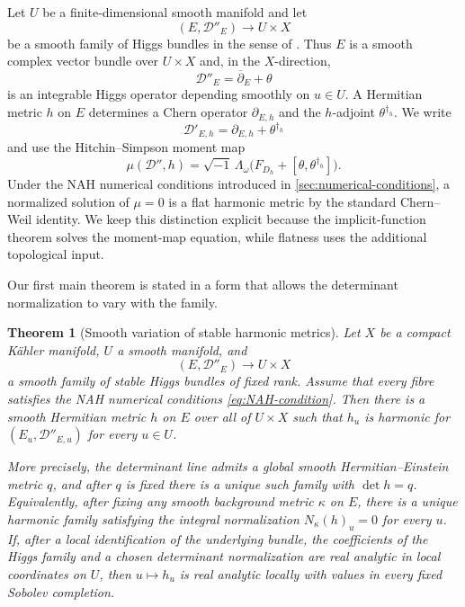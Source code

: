 \documentclass[11pt,reqno]{amsart}
\newtheorem{theorem}{Theorem}[section]
\theoremstyle{definition}
\theoremstyle{remark}
\newcommand{\cD}{\mathcal D}
\newcommand{\ddbar}{\overline\partial}
\begin{document}
Let $U$ be a finite-dimensional smooth manifold and let
\[
  (E,\cD''_E)\longrightarrow U\times X
\]
be a smooth family of Higgs bundles in the sense of \cite{AzamRayan2026}.  Thus $E$ is a smooth complex vector bundle over $U\times X$ and, in the $X$-direction,
\[
  \cD''_E=\ddbar_E+\theta
\]
is an integrable Higgs operator depending smoothly on $u\in U$.  A Hermitian metric $h$ on $E$ determines a Chern operator $\partial_{E,h}$ and the $h$-adjoint $\theta^{\dagger_h}$.  We write
\[
  \cD'_{E,h}=\partial_{E,h}+\theta^{\dagger_h}
\]
and use the Hitchin--Simpson moment map
\begin{equation}\label{eq:intro-moment-map}
  \mu(\cD'',h)
  =\sqrt{-1}\,\Lambda_\omega
  \bigl(F_{D_h}+[\theta,\theta^{\dagger_h}]\bigr).
\end{equation}
Under the NAH numerical conditions introduced in \cref{sec:numerical-conditions}, a normalized solution of $\mu=0$ is a flat harmonic metric by the standard Chern--Weil identity.  We keep this distinction explicit because the implicit-function theorem solves the moment-map equation, while flatness uses the additional topological input.

Our first main theorem is stated in a form that allows the determinant normalization to vary with the family.

\begin{theorem}[Smooth variation of stable harmonic metrics]\label{thm:intro-smooth-metrics}
Let $X$ be a compact K\"ahler manifold, $U$ a smooth manifold, and
\[
  (E,\cD''_E)\longrightarrow U\times X
\]
a smooth family of stable Higgs bundles of fixed rank.  Assume that every fibre satisfies the NAH numerical conditions \eqref{eq:NAH-condition}.  Then there is a smooth Hermitian metric $h$ on $E$ over all of $U\times X$ such that $h_u$ is harmonic for $(E_u,\cD''_{E,u})$ for every $u\in U$.

More precisely, the determinant line admits a global smooth Hermitian--Einstein metric $q$, and after $q$ is fixed there is a unique such family with $\det h=q$.  Equivalently, after fixing any smooth background metric $\kappa$ on $E$, there is a unique harmonic family satisfying the integral normalization $N_\kappa(h)_u=0$ for every $u$.  If, after a local identification of the underlying bundle, the coefficients of the Higgs family and a chosen determinant normalization are real analytic in local coordinates on $U$, then $u\mapsto h_u$ is real analytic locally with values in every fixed Sobolev completion.
\end{theorem}
\end{document}
